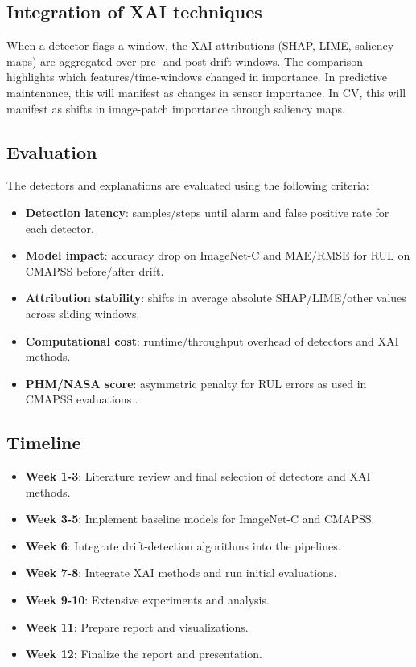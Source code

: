 \subsection{Integration of XAI techniques}
When a detector flags a window, the XAI attributions (SHAP, LIME, saliency maps) are aggregated over pre- and post-drift windows.
The comparison highlights which features/time-windows changed in importance.
In predictive maintenance, this will manifest as changes in sensor importance.
In CV, this will manifest as shifts in image-patch importance through saliency maps.

\subsection{Evaluation}
The detectors and explanations are evaluated using the following criteria:
\begin{itemize}
  \item \textbf{Detection latency}: samples/steps until alarm and false positive rate for each detector.
  \item \textbf{Model impact}: accuracy drop on ImageNet-C and MAE/RMSE for RUL on CMAPSS before/after drift.
  \item \textbf{Attribution stability}: shifts in average absolute SHAP/LIME/other values across sliding windows.
  \item \textbf{Computational cost}: runtime/throughput overhead of detectors and XAI methods.
  \item \textbf{PHM/NASA score}: asymmetric penalty for RUL errors as used in CMAPSS evaluations \autocite{Saxena2008}.
\end{itemize}

\subsection{Timeline}
\begin{itemize}
  \item \textbf{Week 1-3}: Literature review and final selection of detectors and XAI methods.
  \item \textbf{Week 3-5}: Implement baseline models for ImageNet-C and CMAPSS.
  \item \textbf{Week 6}: Integrate drift-detection algorithms into the pipelines.
  \item \textbf{Week 7-8}: Integrate XAI methods and run initial evaluations.
  \item \textbf{Week 9-10}: Extensive experiments and analysis.
  \item \textbf{Week 11}: Prepare report and visualizations.
  \item \textbf{Week 12}: Finalize the report and presentation.
\end{itemize}

